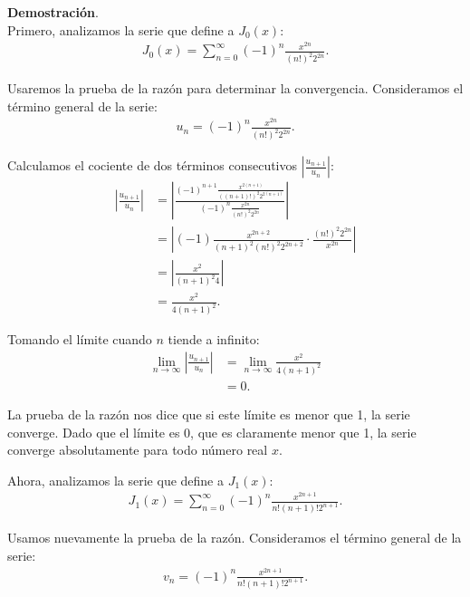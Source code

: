 \documentclass{article}
\begin{document}
    \textbf{Demostración}.\\

    Primero, analizamos la serie que define a \(J_{0}(x)\):
        \begin{align*}
        J_{0}(x) = \sum_{n=0}^{\infty} (-1)^n \frac{x^{2n}}{(n!)^2 2^{2n}}.
        \end{align*}

    Usaremos la prueba de la razón para determinar la convergencia. Consideramos el término general de la serie:
        \begin{align*}
        u_n = (-1)^n \frac{x^{2n}}{(n!)^2 2^{2n}}.
        \end{align*}

    Calculamos el cociente de dos términos consecutivos \( \left| \frac{u_{n+1}}{u_n} \right| \):
        \begin{align*}
        \left| \frac{u_{n+1}}{u_n} \right| &= \left| \frac{(-1)^{n+1} \frac{x^{2(n+1)}}{((n+1)!)^2 2^{2(n+1)}}}{(-1)^n \frac{x^{2n}}{(n!)^2 2^{2n}}} \right| \\
        &= \left| (-1) \frac{x^{2n+2}}{(n+1)^2 (n!)^2 2^{2n+2}} \cdot \frac{(n!)^2 2^{2n}}{x^{2n}} \right| \\
        &= \left| \frac{x^2}{(n+1)^2 4} \right| \\
        &= \frac{x^2}{4(n+1)^2}.
        \end{align*}

    Tomando el límite cuando \( n \) tiende a infinito:
        \begin{align*}
        \lim_{n \to \infty} \left| \frac{u_{n+1}}{u_n} \right| &= \lim_{n \to \infty} \frac{x^2}{4(n+1)^2} \\
        &= 0.
        \end{align*}

    La prueba de la razón nos dice que si este límite es menor que 1, la serie converge. Dado que el límite es 0, que es claramente menor que 1, la serie converge absolutamente para todo número real \( x \).

    Ahora, analizamos la serie que define a \(J_{1}(x)\):
        \begin{align*}
        J_{1}(x) = \sum_{n=0}^{\infty} (-1)^n \frac{x^{2n+1}}{n!(n+1)! 2^{n+1}}.
        \end{align*}

    Usamos nuevamente la prueba de la razón. Consideramos el término general de la serie:
        \begin{align*}
        v_n = (-1)^n \frac{x^{2n+1}}{n!(n+1)! 2^{n+1}}.
        \end{align*}
\end{document}
